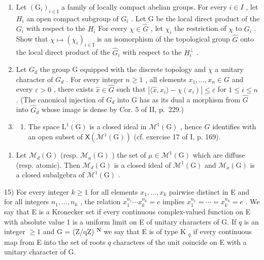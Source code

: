 \begin{enumerate}
\def\labelenumi{\arabic{enumi})}
\setcounter{enumi}{11}
\item
  Let \((\mathrm{G}_{i})_{i\in\mathrm{I}}\) a family of locally compact abelian groups. For every \(i\in I\) , let \(H_{i}\) an open compact subgroup of \(G_{i}\) . Let G be the local direct product of the \(G_{i}\) with respect to the \(H_{i}\) For every \(\chi\in\widehat{G}\) , let \(\chi_{i}\) the restriction of \(\chi\) to \(G_{i}\) . Show that \(\chi\mapsto(\chi_{i})_{i\in\mathrm{I}}\) is an isomorphism of the topological group \(\widehat{G}\) onto the local direct product of the \(\widehat{G}_{i}\) with respect to the \(H_{i}^{\perp}\) .
\item
  Let \(G_{d}\) the group G equipped with the discrete topology and \(\chi\) a unitary character of \(G_{d}\) . For every integer \(n \geqslant 1\) , all elements \(x_{1}, \ldots, x_{n} \in G\) and every \(\varepsilon > 0\) , there exists \(\widehat{x} \in \widehat{G}\) such that \(|\langle\widehat{x}, x_{i}\rangle - \chi(x_{i})| \leqslant \varepsilon\) for \(1 \leqslant i \leqslant n\) . (The canonical injection of \(G_{d}\) into G has as its dual a morphism from \(\widehat{G}\) into \(\widehat{G}_{d}\) whose image is dense by Cor. 5 of II, p.~229.)
\item
  \begin{enumerate}
  \def\labelenumii{\alph{enumii})}
  \tightlist
  \item
    The space \(\mathrm{L}^{1}(\mathrm{G})\) is a closed ideal in \(\mathcal{M}^{1}(\mathrm{G})\) , hence \(\widehat{G}\) identifies with an open subset of \(\mathsf{X}(\mathcal{M}^{1}(\mathrm{G}))\) (cf. exercise 17 of I, p. 169).
  \end{enumerate}
\end{enumerate}

\begin{enumerate}
\def\labelenumi{\alph{enumi})}
\setcounter{enumi}{1}
\tightlist
\item
  Let \(\mathcal{M}_{d}(\mathrm{G})\) (resp. \(\mathcal{M}_{a}(\mathrm{G})\) ) the set of \(\mu\in\mathcal{M}^{1}(\mathrm{G})\) which are diffuse (resp. atomic). Then \(\mathcal{M}_{d}(\mathrm{G})\) is a closed ideal of \(\mathcal{M}^{1}(\mathrm{G})\) and \(\mathcal{M}_{a}(\mathrm{G})\) is a closed subalgebra of \(\mathcal{M}^{1}(\mathrm{G})\) .
\end{enumerate}

15) For every integer \(k \geqslant 1\) for all elements \(x_1, \ldots, x_k\) pairwise distinct in E and for all integers \(n_1, \ldots, n_k\) , the relation \(x_1^{n_1} \cdots x_k^{n_k} = e\) implies \(x_1^{n_1} = \cdots = x_k^{n_k} = e\) . We say that E is a Kronecker set if every continuous complex-valued function on E with absolute value 1 is a uniform limit on E of unitary characters of G. If \(q\) is an integer \(\geqslant 1\) and G = (Z/qZ) \(^{\mathbf{N}}\) we say that E is of type K \(_q\) if every continuous map from E into the set of roots \(q\) characters of the unit coincide on E with a unitary character of G.

